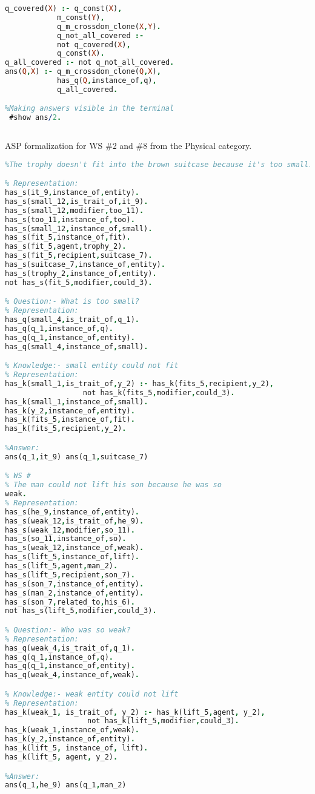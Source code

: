 \begin{lstlisting}[language=Prolog]
%Extracting the answers to the input question. (Step 5)
q_covered(X) :- q_const(X),
			m_const(Y),
			q_m_crossdom_clone(X,Y).
			q_not_all_covered :-
			not q_covered(X),
			q_const(X).
q_all_covered :- not q_not_all_covered.
ans(Q,X) :- q_m_crossdom_clone(Q,X),
			has_q(Q,instance_of,q),
			q_all_covered.

%Making answers visible in the terminal
 #show ans/2.
 
\end{lstlisting} 


ASP formalization for WS \#2 and \#8 from the Physical category.

\begin{lstlisting}[language=Prolog]
% WS #2:
%The trophy doesn't fit into the brown suitcase because it's too small.

% Representation:
has_s(it_9,instance_of,entity).
has_s(small_12,is_trait_of,it_9).
has_s(small_12,modifier,too_11).
has_s(too_11,instance_of,too).
has_s(small_12,instance_of,small).
has_s(fit_5,instance_of,fit).
has_s(fit_5,agent,trophy_2).
has_s(fit_5,recipient,suitcase_7).
has_s(suitcase_7,instance_of,entity).
has_s(trophy_2,instance_of,entity).
not has_s(fit_5,modifier,could_3).

% Question:- What is too small?
% Representation:
has_q(small_4,is_trait_of,q_1).
has_q(q_1,instance_of,q).
has_q(q_1,instance_of,entity).
has_q(small_4,instance_of,small).

% Knowledge:- small entity could not fit
% Representation:
has_k(small_1,is_trait_of,y_2) :- has_k(fits_5,recipient,y_2),
				  not has_k(fits_5,modifier,could_3).
has_k(small_1,instance_of,small).
has_k(y_2,instance_of,entity).
has_k(fits_5,instance_of,fit).
has_k(fits_5,recipient,y_2).

%Answer: 
ans(q_1,it_9) ans(q_1,suitcase_7) 

% WS #
% The man could not lift his son because he was so
weak.
% Representation:
has_s(he_9,instance_of,entity).
has_s(weak_12,is_trait_of,he_9).
has_s(weak_12,modifier,so_11).
has_s(so_11,instance_of,so).
has_s(weak_12,instance_of,weak).
has_s(lift_5,instance_of,lift).
has_s(lift_5,agent,man_2).
has_s(lift_5,recipient,son_7).
has_s(son_7,instance_of,entity).
has_s(man_2,instance_of,entity).
has_s(son_7,related_to,his_6).
not has_s(lift_5,modifier,could_3).

% Question:- Who was so weak?
% Representation:
has_q(weak_4,is_trait_of,q_1).
has_q(q_1,instance_of,q).
has_q(q_1,instance_of,entity).
has_q(weak_4,instance_of,weak).

% Knowledge:- weak entity could not lift 
% Representation:
has_k(weak_1, is_trait_of, y_2) :- has_k(lift_5,agent, y_2),  
				   not has_k(lift_5,modifier,could_3).
has_k(weak_1,instance_of,weak).
has_k(y_2,instance_of,entity).
has_k(lift_5, instance_of, lift).
has_k(lift_5, agent, y_2).

%Answer: 
ans(q_1,he_9) ans(q_1,man_2)   

\end{lstlisting}